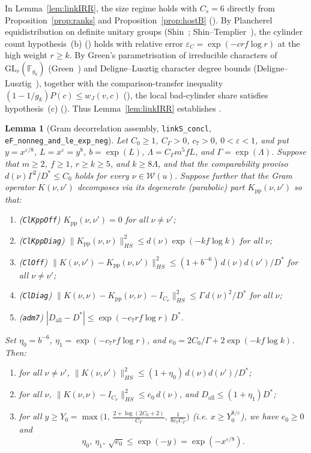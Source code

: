\documentclass[11pt]{amsart}
\newcommand{\eps}{\varepsilon}
\theoremstyle{plain}
\newtheorem{lemma}[theorem]{Lemma}
\theoremstyle{definition}
\numberwithin{equation}{section}
\begin{document}
\noindent In Lemma~\ref{lem:linkIRR}, the size regime  holds with $C_s=6$ directly
from Proposition~\ref{prop:ranks} and Proposition~\ref{prop:hostB} (). By
Plancherel equidistribution on definite unitary groups (Shin~\cite[Cor.~4.12]{shin-plancherel};
Shin--Templier~\cite[Thm.~9.16]{shin-templier}), the cylinder count hypothesis~(b)
() holds with relative error $\varepsilon_C=\exp(-c r f\log r)$ at the high
weight $r\ge k$. By Green's parametrisation of irreducible characters of
$\mathrm{GL}_r(\mathbb F_{g_k})$ (Green~\cite[Thm.~14]{green-gln}) and Deligne--Lusztig
character degree bounds (Deligne--Lusztig~\cite[Cor.~7.6]{deligne-lusztig}), together with the
comparison-transfer inequality $(1-1/g_k)P(c)\le w_J(v,c)$ (), the local
bad-cylinder share satisfies hypothesis~(c) (). Thus Lemma~\ref{lem:linkIRR}
establishes .

\begin{lemma}[Gram decorrelation assembly, \texttt{linkS\_concl}, \texttt{eF\_nonneg\_and\_le\_exp\_neg}]\label{lem:linkS}
Let $C_0\ge 1$, $C_\Gamma>0$, $c_7>0$, $0<\eps<1$, and put $y=x^{\eps/8}$, $L=x^\eps=y^8$,
$b=\exp(L)$, $\Lambda=C_\Gamma m^5 f L$, and $\Gamma=\exp(\Lambda)$. Suppose that $m\ge 2$,
$f\ge 1$, $r\ge k\ge 5$, and $k\ge 8\Lambda$, and that the comparability proviso
$d(\nu)\Gamma^2/D^\ast\le C_0$ holds for every $\nu\in\mathcal W(u)$. Suppose further that the
Gram operator $K(\nu,\nu')$ decomposes via its degenerate (parabolic) part $K_{\mathrm{pp}}(\nu,\nu')$
so that:
\begin{enumerate}[label=(\alph*)]
\item \textup{(\texttt{ClKppOff})} $K_{\mathrm{pp}}(\nu,\nu')=0$ for all $\nu\neq\nu'$;
\item \textup{(\texttt{ClKppDiag})} $\|K_{\mathrm{pp}}(\nu,\nu)\|_{HS}^2\le d(\nu)\exp(-kf\log k)$
  for all $\nu$;
\item \textup{(\texttt{ClOff})} $\|K(\nu,\nu')-K_{\mathrm{pp}}(\nu,\nu')\|_{HS}^2\le
  (1+b^{-6})\,d(\nu)d(\nu')/D^\ast$ for all $\nu\neq\nu'$;
\item \textup{(\texttt{ClDiag})} $\|K(\nu,\nu)-K_{\mathrm{pp}}(\nu,\nu)-I_{C_\nu}\|_{HS}^2\le
  \Gamma\,d(\nu)^2/D^\ast$ for all $\nu$;
\item \textup{(\texttt{adm7})} $|D_{\mathrm{all}}-D^\ast|\le\exp(-c_7 r f\log r)\,D^\ast$.
\end{enumerate}
Set $\eta_0=b^{-6}$, $\eta_1=\exp(-c_7 r f\log r)$, and
$e_0=2C_0/\Gamma+2\exp(-kf\log k)$. Then:
\begin{enumerate}[label=(\roman*)]
\item for all $\nu\neq\nu'$, $\|K(\nu,\nu')\|_{HS}^2\le(1+\eta_0)\,d(\nu)d(\nu')/D^\ast$;
\item for all $\nu$, $\|K(\nu,\nu)-I_{C_\nu}\|_{HS}^2\le e_0\,d(\nu)$, and
  $D_{\mathrm{all}}\le(1+\eta_1)D^\ast$;
\item for all $y\ge Y_0=\max\bigl(1,\,\frac{2+\log(2C_0+2)}{C_\Gamma},\,\frac{1}{8c_7 C_\Gamma}\bigr)$
  (i.e. $x\ge Y_0^{8/\eps}$), we have $e_0\ge 0$ and
  \[
  \eta_0,\ \eta_1,\ \sqrt{e_0}\le\exp(-y)=\exp(-x^{\eps/8}).
  \]
\end{enumerate}
\end{lemma}
\end{document}
